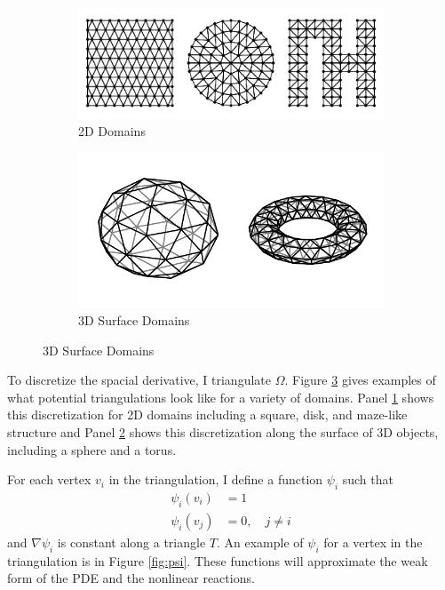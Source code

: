 \begin{figure}[t!]
    \centering
    \caption{Triangulations of different domains}

    \begin{subfigure}{\textwidth}
        \centering
        \includegraphics{figures/2dtris.pdf}
        \caption{2D Domains}
        \label{subfig:2dtris}
    \end{subfigure}

    \begin{subfigure}{\textwidth}
        \centering
        \includegraphics{figures/3dtris.pdf}
        \caption{3D Surface Domains}
        \label{subfig:3dtris}
    \end{subfigure}

    \label{fig:tris}
\end{figure}

To discretize the spacial derivative, I triangulate $\Omega$. Figure \ref{fig:tris} gives examples of what potential triangulations look like for a variety of domains. Panel \ref{subfig:2dtris} shows this discretization for 2D domains including a square, disk, and maze-like structure and Panel \ref{subfig:3dtris} shows this discretization along the surface of 3D objects, including a sphere and a torus.

For each vertex $v_i$ in the triangulation, I define a function $\psi_i$ such that
\begin{align*}
    \psi_i (v_i) &= 1 \\
    \psi_i (v_j) &= 0, \quad j \neq i
\end{align*}
and $\nabla \psi_i$ is constant along a triangle $T$. An example of $\psi_i$ for a vertex in the triangulation is in Figure \ref{fig:psi}. These functions will approximate the weak form of the PDE and the nonlinear reactions.

